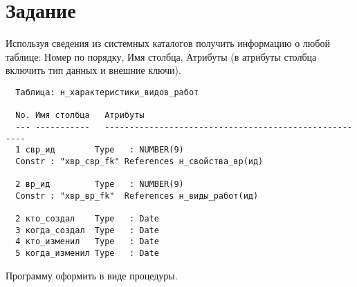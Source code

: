 \section{Задание}
Используя сведения из системных каталогов получить информацию о любой таблице:
Номер по порядку,
Имя столбца,
Атрибуты (в атрибуты столбца включить тип данных и внешние ключи).

\begin{verbatim}
  Таблица: н_характеристики_видов_работ  

  No. Имя столбца   Атрибуты
  --- -----------   ------------------------------------------------------
  1 свр_ид        Type   : NUMBER(9)
  Constr : "хвр_свр_fk" References н_свойства_вр(ид)

  2 вр_ид         Type   : NUMBER(9)
  Constr : "хвр_вр_fk"  References н_виды_работ(ид)

  2 кто_создал    Type   : Date
  3 когда_создал  Type   : Date
  4 кто_изменил   Type   : Date
  5 когда_изменил Type   : Date
\end{verbatim}

Программу оформить в виде процедуры.

